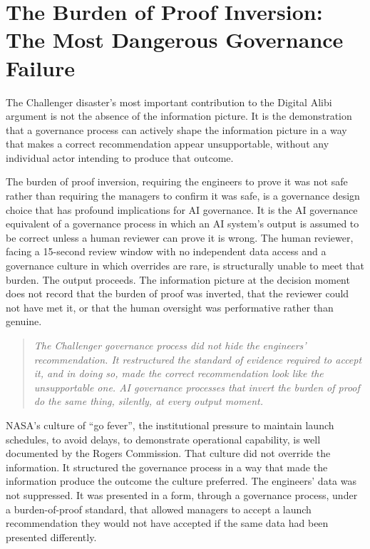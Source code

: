 \scenebreak

\section{The Burden of Proof Inversion: The Most Dangerous Governance Failure}

The Challenger disaster's most important contribution to the Digital Alibi argument is not the absence of the information picture. It is the demonstration that a governance process can actively shape the information picture in a way that makes a correct recommendation appear unsupportable, without any individual actor intending to produce that outcome.

The burden of proof inversion, requiring the engineers to prove it was not safe rather than requiring the managers to confirm it was safe, is a governance design choice that has profound implications for AI governance. It is the AI governance equivalent of a governance process in which an AI system's output is assumed to be correct unless a human reviewer can prove it is wrong. The human reviewer, facing a 15-second review window with no independent data access and a governance culture in which overrides are rare, is structurally unable to meet that burden. The output proceeds. The information picture at the decision moment does not record that the burden of proof was inverted, that the reviewer could not have met it, or that the human oversight was performative rather than genuine.

\begin{quote}
\emph{The Challenger governance process did not hide the engineers' recommendation. It restructured the standard of evidence required to accept it, and in doing so, made the correct recommendation look like the unsupportable one. AI governance processes that invert the burden of proof do the same thing, silently, at every output moment.}
\end{quote}

NASA's culture of ``go fever'', the institutional pressure to maintain launch schedules, to avoid delays, to demonstrate operational capability, is well documented by the Rogers Commission. That culture did not override the information. It structured the governance process in a way that made the information produce the outcome the culture preferred. The engineers' data was not suppressed. It was presented in a form, through a governance process, under a burden-of-proof standard, that allowed managers to accept a launch recommendation they would not have accepted if the same data had been presented differently.


